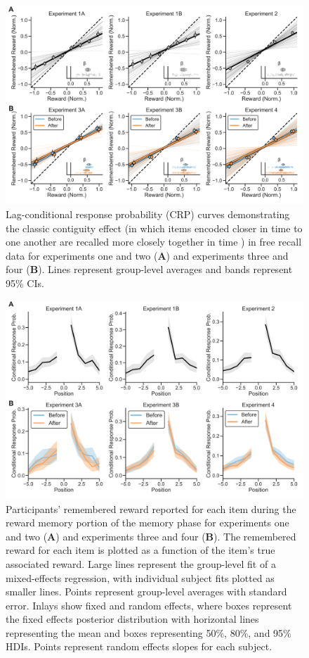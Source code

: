 \documentclass[10pt,letterpaper]{article}
\begin{document}
  \clearpage
\begin{figure}[h]
    \centering
    \includegraphics[width=1
    \textwidth]{figures/FigureS2.pdf}
    \caption{Lag-conditional response probability (CRP) curves demonstrating the classic contiguity effect (in which items encoded closer in time to one another are recalled more closely together in time \cite{kahanaFoundationsHumanMemory2012}) in free recall data for experiments one and two (\textbf{A}) and experiments three and four (\textbf{B}). Lines represent group-level averages and bands represent 95\% CIs.}
    \label{fig:suppFig2}
\end{figure}

 \clearpage
\begin{figure}[h]
    \centering
    \includegraphics[width=1
    \textwidth]{figures/FigureS3.pdf}
    \caption{Participants' remembered reward reported for each item during the reward memory portion of the memory phase for experiments one and two (\textbf{A}) and experiments three and four (\textbf{B}). The remembered reward for each item is plotted as a function of the item's true associated reward. Large lines represent the group-level fit of a mixed-effects regression, with individual subject fits plotted as smaller lines. Points represent group-level averages with standard error. Inlays show fixed and random effects, where boxes represent the fixed effects posterior distribution with horizontal lines representing the mean and boxes representing 50\%, 80\%, and 95\% HDIs. Points represent random effects slopes for each subject.}
    \label{fig:suppFig3}
\end{figure}
\end{document}
